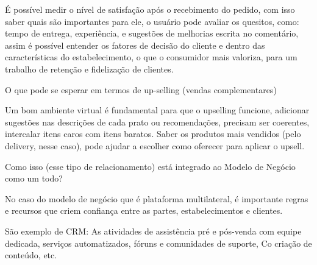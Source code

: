 É possível medir o nível de satisfação após o recebimento do pedido, com isso saber quais são importantes para ele, o usuário pode avaliar os quesitos, como: tempo de entrega, experiência, e sugestões de melhorias escrita no comentário, assim é possível entender os fatores de decisão do cliente e dentro das características do estabelecimento,  o que o consumidor mais valoriza, para um trabalho de retenção e fidelização de clientes.\par


\begin{commentA} \vspace{0.3cm} \noindent O que pode se esperar em termos de up-selling (vendas complementares) \par \vspace{0.1cm} \end{commentA}


Um bom ambiente virtual é fundamental para que o upselling funcione, adicionar sugestões nas descrições de cada prato ou recomendações, precisam ser coerentes, intercalar itens caros com itens baratos. Saber os produtos mais vendidos (pelo delivery, nesse caso), pode ajudar a escolher como oferecer para aplicar o upsell.\par


\begin{commentA} \vspace{0.3cm} \noindent Como isso (esse tipo de relacionamento) está integrado ao Modelo de Negócio como um todo?
\par \vspace{0.1cm} \end{commentA}


No caso do modelo de negócio que é plataforma multilateral, é importante regras e recursos que criem confiança entre as partes, estabelecimentos e clientes.\par


\begin{commentA} \vspace{0.3cm} \noindent São exemplo de CRM:
As atividades de assistência pré e pós-venda com equipe dedicada, serviços automatizados, fóruns e comunidades de suporte, Co criação de conteúdo, etc. \par \vspace{0.1cm} \end{commentA}


